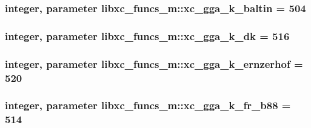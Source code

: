 \hypertarget{classlibxc__funcs__m_a3b6e77a50efec006507e25ac624b3972}{
\subsubsection[{xc\-\_\-gga\-\_\-k\-\_\-baltin}]{\setlength{\rightskip}{0pt plus 5cm}integer, parameter libxc\-\_\-funcs\-\_\-m\-::xc\-\_\-gga\-\_\-k\-\_\-baltin = 504}}\label{classlibxc__funcs__m_a3b6e77a50efec006507e25ac624b3972}
\hypertarget{classlibxc__funcs__m_a36eb3be135160cf0bfc1d3de2bced88c}{
\subsubsection[{xc\-\_\-gga\-\_\-k\-\_\-dk}]{\setlength{\rightskip}{0pt plus 5cm}integer, parameter libxc\-\_\-funcs\-\_\-m\-::xc\-\_\-gga\-\_\-k\-\_\-dk = 516}}\label{classlibxc__funcs__m_a36eb3be135160cf0bfc1d3de2bced88c}
\hypertarget{classlibxc__funcs__m_aa3eec69214fa28babffd3b5d385b8cf8}{
\subsubsection[{xc\-\_\-gga\-\_\-k\-\_\-ernzerhof}]{\setlength{\rightskip}{0pt plus 5cm}integer, parameter libxc\-\_\-funcs\-\_\-m\-::xc\-\_\-gga\-\_\-k\-\_\-ernzerhof = 520}}\label{classlibxc__funcs__m_aa3eec69214fa28babffd3b5d385b8cf8}
\hypertarget{classlibxc__funcs__m_a65556ad1369c3ba7f362aaa342c4b0b5}{
\subsubsection[{xc\-\_\-gga\-\_\-k\-\_\-fr\-\_\-b88}]{\setlength{\rightskip}{0pt plus 5cm}integer, parameter libxc\-\_\-funcs\-\_\-m\-::xc\-\_\-gga\-\_\-k\-\_\-fr\-\_\-b88 = 514}}\label{classlibxc__funcs__m_a65556ad1369c3ba7f362aaa342c4b0b5}
